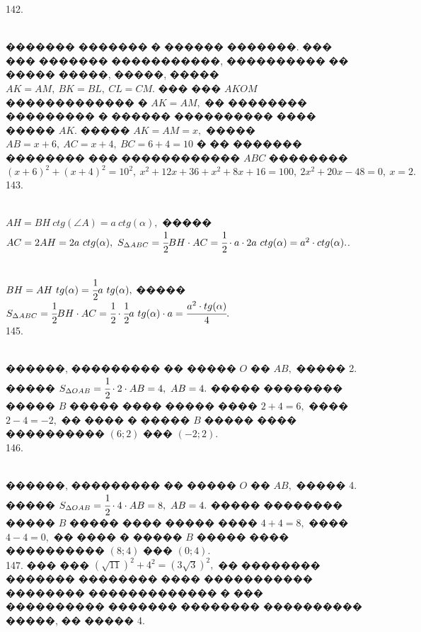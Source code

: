 \documentclass[12pt]{article}
\begin{document}
142. \begin{figure}[ht!]
\end{figure}\\
������� ������� � ������ �������. ��� ��� ������� �����������, ���������� �� ����� �����, �����, ����� $AK=AM,\ BK=BL,\ CL=CM.$ ��� ��� $AKOM$ ������������� � $AK=AM,$ �� �������� ��������� � ������ ���������� ���� ����� $AK.$ ����� $AK=AM=x,$ ����� $AB=x+6,\ AC=x+4,\ BC=6+4=10$ � �� ������� �������� ��� ������������ $ABC$ �������� $(x+6)^2+(x+4)^2=10^2,\ x^2+12x+36+x^2+8x+16=100,\ 2x^2+20x-48=0,\ x=2.$\\
143. \begin{figure}[ht!]
\end{figure}\\
$AH=BH\ ctg(\angle A)=a\ ctg(\alpha),$ ����� $AC=2AH=2a\ ctg(\alpha),\ S_{\Delta ABC}=\cfrac{1}{2}BH\cdot AC=\cfrac{1}{2}\cdot a \cdot2a\ ctg(\alpha)=a^2\cdot ctg(\alpha).$\newpage{}. \begin{figure}[ht!]
\end{figure}\\
$BH=AH\ tg(\alpha)=\cfrac{1}{2}a\ tg(\alpha),$ ����� $S_{\Delta ABC}=\cfrac{1}{2}BH\cdot AC=\cfrac{1}{2}\cdot \cfrac{1}{2}a\ tg(\alpha)\cdot a=\cfrac{a^2\cdot tg(\alpha)}{4}.$\\
145. \begin{figure}[ht!]
\end{figure}\\
������, ��������� �� ����� $O$ �� $AB,$ ����� 2. ����� $S_{\Delta OAB}=\cfrac{1}{2}\cdot 2 \cdot AB=4,\ AB=4.$ ����� �������� ����� $B$ ����� ���� ����� ���� $2+4=6,$ ���� $2-4=-2,$ �� ���� � ����� $B$ ����� ���� ���������� $(6;2)$ ��� $(-2;2).$\\
146. \begin{figure}[ht!]
\end{figure}\\
������, ��������� �� ����� $O$ �� $AB,$ ����� 4. ����� $S_{\Delta OAB}=\cfrac{1}{2}\cdot 4 \cdot AB=8,\ AB=4.$ ����� �������� ����� $B$ ����� ���� ����� ���� $4+4=8,$ ���� $4-4=0,$ �� ���� � ����� $B$ ����� ���� ���������� $(8;4)$ ��� $(0;4).$\\
147. ��� ��� $(\sqrt{11})^2+4^2=(3\sqrt{3})^2,$ �� �������� ������� �������� ���� ����������� �������� ������������� � ��� ���������� ������� �������� ���������� �����, �� ����� 4.\\
\end{document}
